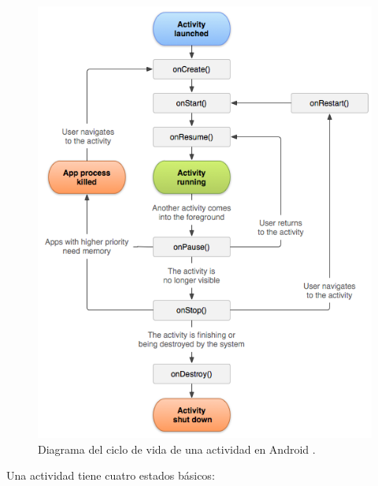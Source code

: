 \begin{figure}[!htbp] \centering
    \includegraphics[width=12cm]{graphs/activity_lifecycle.png} \caption{Diagrama del ciclo de vida de una actividad en Android \cite{androiddevguide}.}\label{fig:diagrama:ActivityLifecycle}
\end{figure}

Una actividad tiene cuatro estados básicos:


